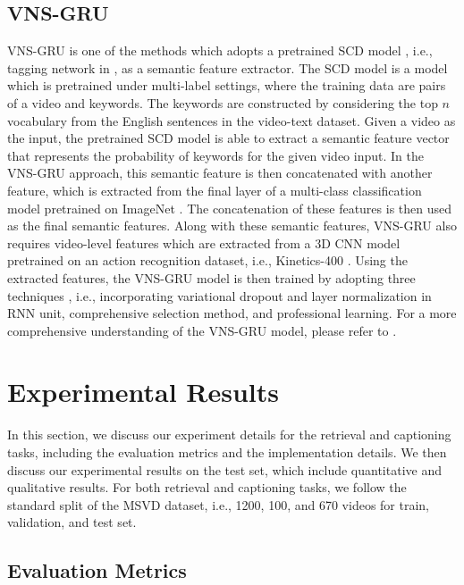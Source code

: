\documentclass{article}
\begin{document}
\subsection{VNS-GRU}
VNS-GRU \cite{DBLP:conf/ecai/Chen0020a} is one of the methods which adopts a pretrained SCD model \cite{SCN_CVPR2017}, i.e., tagging network in \cite{DBLP:conf/ecai/Chen0020a}, as a semantic feature extractor. The SCD model is a model which is pretrained under multi-label settings, where the training data are pairs of a video and keywords. The keywords are constructed by considering the top $n$ vocabulary from the English sentences in the video-text dataset. Given a video as the input, the pretrained SCD model is able to extract a semantic feature vector that represents the probability of keywords for the given video input. In the VNS-GRU approach, this semantic feature is then concatenated with another feature, which is extracted from the final layer of a multi-class classification model pretrained on ImageNet \cite{deng2009imagenet}. The concatenation of these features is then used as the final semantic features. Along with these semantic features, VNS-GRU also requires video-level features which are extracted from a 3D CNN model pretrained on an action recognition dataset, i.e., Kinetics-400 \cite{DBLP:journals/corr/KayCSZHVVGBNSZ17}. Using the extracted features, the VNS-GRU model is then trained by adopting three techniques \cite{DBLP:conf/ecai/Chen0020a}, i.e., incorporating variational dropout and layer normalization in RNN unit, comprehensive selection method, and professional learning. For a more comprehensive understanding of the VNS-GRU model, please refer to \cite{DBLP:conf/ecai/Chen0020a}.

\section{Experimental Results}
\label{sec:experiments}
In this section, we discuss our experiment details for the retrieval and captioning tasks, including the evaluation metrics and the implementation details. We then discuss our experimental results on the test set, which include quantitative and qualitative results. For both retrieval and captioning tasks, we follow the standard split of the MSVD dataset, i.e., 1200, 100, and 670 videos for train, validation, and test set.

\subsection{Evaluation Metrics}
\end{document}
